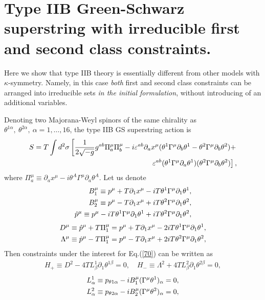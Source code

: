 \documentclass[a4paper]{article}
\begin{document}
\section{Type IIB Green-Schwarz superstring with irreducible first 
and second class constraints.}

Here we show that type IIB theory is essentially different from other 
models with $\kappa$-symmetry. Namely, in this case {\em{both}} first and 
second class constraints can be arranged into irreducible sets 
{\em{in the initial formulation}}, without introducing of an additional 
variables. 

Denoting two Majorana-Weyl spinors of the same chirality as  
$\theta^{1\alpha}, ~ \theta^{2\alpha}, ~ \alpha=1, \ldots ,16$, the  
type IIB GS superstring action is
\begin{eqnarray}\label{70}
S=T\int d^2\sigma
\left[\frac{1}{2\sqrt{-g}}g^{ab}
\Pi_a^\mu \Pi_b^\mu-i\varepsilon^{ab}\partial_ax^\mu
(\theta^1\Gamma^\mu\partial_b\theta^1-
\theta^2\Gamma^\mu\partial_b\theta^2)+\right. \cr 
\left. \varepsilon^{ab}(\theta^1\Gamma^\mu\partial_a\theta^1)
(\theta^2\Gamma^\mu\partial_b\theta^2)\right],
\end{eqnarray}
where $\Pi^\mu_a\equiv
\partial_ax^\mu-i\theta^A\Gamma^\mu\partial_a\theta^A$. Let us denote
\begin{eqnarray}\label{72}
B_1^\mu\equiv p^\mu+T\partial_1x^\mu-iT\theta^1\Gamma^\mu
\partial_1\theta^1, \cr
B_2^\mu\equiv p^\mu-T\partial_1x^\mu+iT\theta^2\Gamma^\mu
\partial_1\theta^2, \cr
\hat p^\mu\equiv p^\mu-iT\theta^1\Gamma^\mu\partial_1\theta^1+
iT\theta^2\Gamma^\mu\partial_1\theta^2,  
\end{eqnarray}
\begin{eqnarray}\label{73}
D^\mu\equiv\hat p^\mu+T\Pi_1^\mu=
p^\mu+T\partial_1x^\mu-2iT\theta^1\Gamma^\mu\partial_1\theta^1, \cr 
\Lambda^\mu\equiv\hat p^\mu-T\Pi_1^\mu=p^\mu-T\partial_1x^\mu+
2iT\theta^2\Gamma^\mu\partial_1\theta^2,
\end{eqnarray}
Then constraints under the interest for Eq.(\ref{70}) can be written as 
\begin{eqnarray}\label{75}
H_+\equiv D^2-4TL^1_\beta\partial_1\theta^{1\beta}=0, \quad
H_-\equiv \Lambda^2+4TL^2_\beta\partial_1\theta^{2\beta}=0,
\end{eqnarray}
\begin{eqnarray}\label{76}
L^1_\alpha\equiv p_{\theta 1\alpha}-iB_1^\mu(\Gamma^\mu
\theta^1)_\alpha=0, \cr 
L^2_\alpha\equiv p_{\theta 2\alpha}-iB_2^\mu(\Gamma^\mu
\theta^2)_\alpha=0,
\end{eqnarray}
\end{document}
